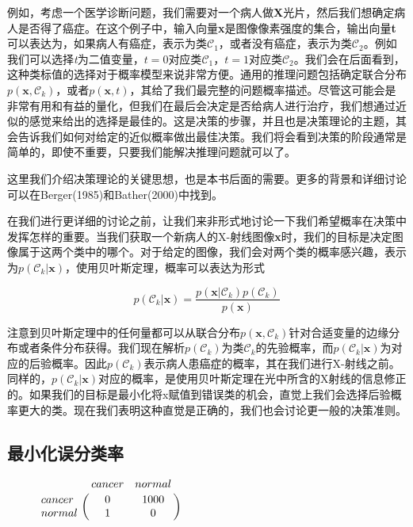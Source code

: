 	例如，考虑一个医学诊断问题，我们需要对一个病人做\textbf{X}光片，然后我们想确定病人是否得了癌症。在这个例子中，输入向量\textbf{x}是图像像素强度的集合，输出向量\textbf{t}可以表达为，如果病人有癌症，表示为类$\mathcal{C}_1$，或者没有癌症，表示为类$\mathcal{C}_2$。例如我们可以选择\textit{t}为二值变量，$t = 0$对应类$\mathcal{C}_1$，$t = 1$对应类$\mathcal{C}_2$。我们会在后面看到，这种类标值的选择对于概率模型来说非常方便。通用的推理问题包括确定联合分布$p(\textbf{x}, \mathcal{C}_k)$，或者$p(\textbf{x},t)$，其给了我们最完整的问题概率描述。尽管这可能会是非常有用和有益的量化，但我们在最后会决定是否给病人进行治疗，我们想通过近似的感觉来给出的选择是最佳的。这是决策的步骤，并且也是决策理论的主题，其会告诉我们如何对给定的近似概率做出最佳决策。我们将会看到决策的阶段通常是简单的，即使不重要，只要我们能解决推理问题就可以了。
	
	这里我们介绍决策理论的关键思想，也是本书后面的需要。更多的背景和详细讨论可以在Berger(1985)和Bather(2000)中找到。
	
	在我们进行更详细的讨论之前，让我们来非形式地讨论一下我们希望概率在决策中发挥怎样的重要。当我们获取一个新病人的X-射线图像\textbf{x}时，我们的目标是决定图像属于这两个类中的哪个。对于给定的图像，我们会对两个类的概率感兴趣，表示为$p(\mathcal{C}_k|\textbf{x})$，使用贝叶斯定理，概率可以表达为形式
	
	\begin{equation}
	p(\mathcal{C}_k | \textbf{x}) = \frac{p(\textbf{x} | \mathcal{C}_k) p(\mathcal{C}_k)}{p(\textbf{x})}
	\end{equation}
	
	注意到贝叶斯定理中的任何量都可以从联合分布$p(\textbf{x}, \mathcal{C}_k)$针对合适变量的边缘分布或者条件分布获得。我们现在解析$p(\mathcal{C}_k)$为类$\mathcal{C}_k$的先验概率，而$p(\mathcal{C}_k | \textbf{x})$为对应的后验概率。因此$p(\mathcal{C}_k)$表示病人患癌症的概率，其在我们进行X-射线之前。同样的，$p(\mathcal{C}_k | \textbf{x})$对应的概率，是使用贝叶斯定理在光中所含的X射线的信息修正的。如果我们的目标是最小化将x赋值到错误类的机会，直觉上我们会选择后验概率更大的类。现在我们表明这种直觉是正确的，我们也会讨论更一般的决策准则。
	
\subsection{最小化误分类率}
	
	
	
	
	
	
	
	
	
	
	
	
	
	\begin{figure}[b]
		\parbox{.5\textwidth}{\caption{  }}
		\parbox{.3\textwidth}{
			$\bordermatrix{%
				& cancer & normal \cr
				cancer & 0 & 1000 \cr
				normal & 1 & 0 \cr
			}$}
	\end{figure}
